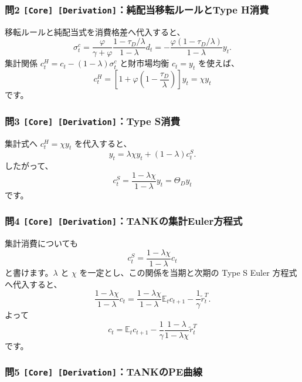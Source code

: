 \documentclass[
  japanese,
  lualatex,
  ja=standard,
  11pt,
  a4paper]{ltjsarticle}
\begin{document}
\subsubsection{\texorpdfstring{問2
\texttt{{[}Core{]}\ {[}Derivation{]}}：純配当移転ルールとType
H消費}{問2 {[}Core{]} {[}Derivation{]}：純配当移転ルールとType H消費}}\label{ux554f2-core-derivationux7d14ux914dux5f53ux79fbux8ee2ux30ebux30fcux30ebux3068type-hux6d88ux8cbb}

移転ルールと純配当式を消費格差へ代入すると、 \[
\sigma_t^c
=\frac{\varphi}{\gamma+\varphi}
\frac{1-\tau_D/\lambda}{1-\lambda}d_t
=-\frac{\varphi(1-\tau_D/\lambda)}{1-\lambda}y_t.
\] 集計関係 \(c_t^H=c_t-(1-\lambda)\sigma_t^c\) と財市場均衡 \(c_t=y_t\)
を使えば、 \[
c_t^H
=\left[1+\varphi\left(1-\frac{\tau_D}{\lambda}\right)\right]y_t
=\chi y_t
\] です。

\subsubsection{\texorpdfstring{問3
\texttt{{[}Core{]}\ {[}Derivation{]}}：Type
S消費}{問3 {[}Core{]} {[}Derivation{]}：Type S消費}}\label{ux554f3-core-derivationtype-sux6d88ux8cbb}

集計式へ \(c_t^H=\chi y_t\) を代入すると、 \[
y_t=\lambda\chi y_t+(1-\lambda)c_t^S.
\] したがって、 \[
c_t^S=\frac{1-\lambda\chi}{1-\lambda}y_t
=\Theta_Dy_t
\] です。

\subsubsection{\texorpdfstring{問4
\texttt{{[}Core{]}\ {[}Derivation{]}}：TANKの集計Euler方程式}{問4 {[}Core{]} {[}Derivation{]}：TANKの集計Euler方程式}}\label{ux554f4-core-derivationtankux306eux96c6ux8a08eulerux65b9ux7a0bux5f0f}

集計消費についても \[
c_t^S=\frac{1-\lambda\chi}{1-\lambda}c_t
\] と書けます。\(\lambda\) と \(\chi\)
を一定とし、この関係を当期と次期の Type S Euler 方程式へ代入すると、 \[
\frac{1-\lambda\chi}{1-\lambda}c_t
=\frac{1-\lambda\chi}{1-\lambda}\mathbb E_tc_{t+1}
-\frac1\gamma\widetilde r_t^T.
\] よって \[
c_t=\mathbb E_tc_{t+1}
-\frac1\gamma\frac{1-\lambda}{1-\lambda\chi}
\widetilde r_t^T
\] です。

\subsubsection{\texorpdfstring{問5
\texttt{{[}Core{]}\ {[}Derivation{]}}：TANKのPE曲線}{問5 {[}Core{]} {[}Derivation{]}：TANKのPE曲線}}\label{ux554f5-core-derivationtankux306epeux66f2ux7dda}
\end{document}
